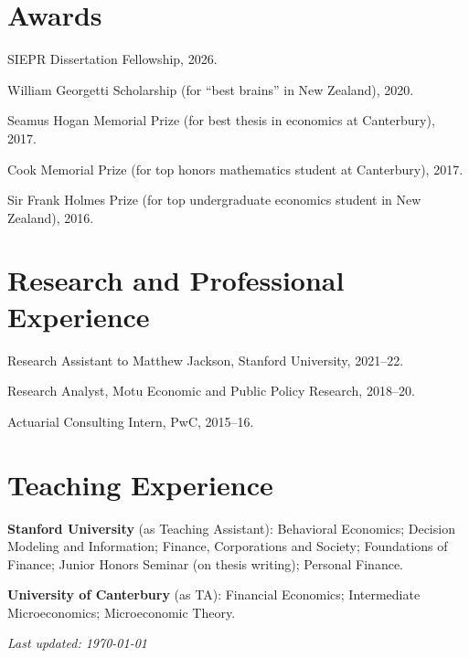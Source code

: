 \documentclass[11pt,oneside]{memoir}
\newcommand{\npentry}[1]{\par\hangindent=0.25in #1}
\newcommand{\entry}[1]{\npentry{#1.}}
\begin{document}
\section{Awards}

\entry{SIEPR Dissertation Fellowship, 2026}
\entry{William Georgetti Scholarship (for ``best brains'' in New Zealand), 2020}
\entry{Seamus Hogan Memorial Prize (for best thesis in economics at Canterbury), 2017}
\entry{Cook Memorial Prize (for top honors mathematics student at Canterbury), 2017}
\entry{Sir Frank Holmes Prize (for top undergraduate economics student in New Zealand), 2016}

\section{Research and Professional Experience}

\entry{Research Assistant to Matthew Jackson, Stanford University, 2021--22}
\entry{Research Analyst, Motu Economic and Public Policy Research, 2018--20}
\entry{Actuarial Consulting Intern, PwC, 2015--16}

\section{Teaching Experience}

\entry{{\bfseries Stanford University} (as Teaching Assistant): Behavioral Economics; Decision Modeling and Information; Finance, Corporations and Society; Foundations of Finance; Junior Honors Seminar (on thesis writing); Personal Finance}
\entry{{\bfseries University of Canterbury} (as TA): Financial Economics; Intermediate Microeconomics; Microeconomic Theory}

\vfill\hfill{\itshape\small Last updated: \today}
\end{document}
